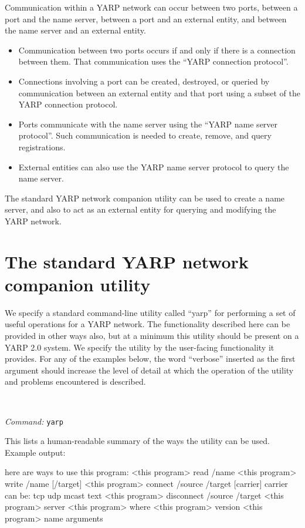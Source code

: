 \documentclass[a4]{article}
\newcommand{\pflist}
  {     \renewcommand{\labelitemi}{$\triangleright$}
        \setlength{\itemsep}{0mm}
        \setlength{\parsep}{0mm}
        \setlength{\partopsep}{0mm}
        \setlength{\topsep}{0mm}
        \setlength{\parskip}{0mm}    }
\newenvironment{packed_itemize}{
\begin{itemize}
  \renewcommand{\labelitemi}{$\triangleright$}
  \setlength{\itemsep}{1pt}
  \setlength{\parskip}{0pt}
  \setlength{\parsep}{0pt}
}{\end{itemize}}
\newcommand{\newusage}{\ \\\noindent\makebox[\textwidth]{\hrulefill}}
\newcommand{\usage}[1]{ \begin{packed_itemize} \item {\it Command:} {\tt #1} \end{packed_itemize}}
\begin{document}
\noindent
Communication within a YARP network can occur between two ports,
between a port and the name server, between a port and an
external entity, and between the name server and an external entity.


\begin{itemize} \pflist

\item Communication between two ports occurs if and only if there
is a connection between them.  That communication uses the
``YARP connection protocol''.

\item Connections involving a port can be created, destroyed, or
queried by communication between an external entity and that port
using a subset of the YARP connection protocol.

\item Ports communicate with the name server using the 
``YARP name server protocol''.  Such communication is needed
to create, remove, and query registrations.

\item External entities can also use the YARP name server protocol
to query the name server.

\end{itemize}

\noindent
The standard YARP network companion utility can be used to create a
name server, and also to act as an external entity for querying and
modifying the YARP network.

\section{The standard YARP network companion utility}

We specify a standard command-line 
utility called ``yarp'' for performing a set of
useful operations for a YARP network.  
%
The functionality described here 
can be provided in other ways also, but
at a minimum this utility should be present on a YARP 2.0 
system.
%
We specify the utility by the user-facing functionality
it provides.  For any of the examples below, the word ``verbose'' 
inserted as the first argument should increase the level of 
detail at which the operation of the utility and problems
encountered is described.


\newusage{}
\usage{yarp}
%
This lists a human-readable summary of the 
ways the utility can be used.  Example output:

\begin{code}
here are ways to use this program:
  <this program> read /name
  <this program> write /name [/target]
  <this program> connect /source /target [carrier]
     carrier can be: tcp udp mcast text
  <this program> disconnect /source /target
  <this program> server
  <this program> where
  <this program> version
  <this program> name {arguments}
\end{code}
\end{document}

